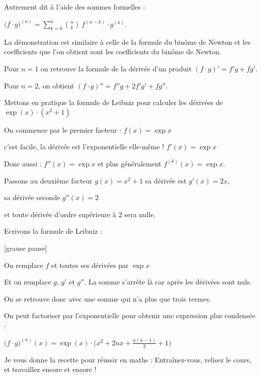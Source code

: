 \change

Autrement dit à l'aide des sommes formelles :

$\big( f \cdot g \big)^{(n)} = \sum_{k=0}^n \binom{n}{k} \ f^{(n-k)} \cdot g^{(k)}.$

La démonstration est similaire à celle de la formule du binôme de Newton
et les coefficients que l'on obtient sont les coefficients du binôme de Newton.

\change

Pour $n=1$ on retrouve la formule de la dérivée d'un produit $(f\cdot g)'= f' g + f g'$.

\change

Pour $n=2$, on obtient $(f\cdot g)''= f''g + 2f' g' + fg''$.


\diapo

Mettons en pratique la formule de Leibniz pour calculer les dérivées de $\exp(x) \cdot (x^2+1)$

\change

On commence par le premier facteur : $f(x)=\exp x$ 

c'est facile, la dérivée est l'exponentielle elle-même !
 $f'(x)=\exp x$ 

Donc aussi :  $f''(x)=\exp x$ et plus généralement $f^{(k)}(x)=\exp x$.

\change

Passons au deuxième facteur $g(x)=x^2+1$ sa dérivée est  $g'(x)=2x$,


sa dérivée seconde $g''(x)=2$ 

et toute dérivée d'ordre supérieure à $2$ sera nulle.

\change

Ecrivons la formule de Leibniz :

[grause pause]


\change 


On remplace $f$ et toutes ses dérivées par $\exp x$

Et on remplace $g$, $g'$ et $g''$. La somme s'arrête là car après les dérivées sont nuls.



On se retrouve donc avec une somme qui n'a plus que trois termes.

\change

On peut factoriser par l'exponentielle pour obtenir une expression plus condensée :

$\big( f \cdot g \big)^{(n)}(x) =  \exp(x) \cdot \Big(x^2 + 2nx + \frac{n(n-1)}{2}+1  \Big)$


\diapo

Je vous donne la recette pour réussir en maths :
Entraînez-vous, relisez le cours, et travaillez encore et encore !


